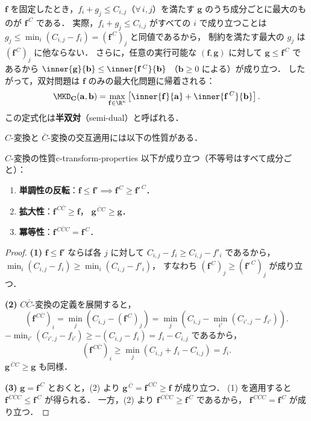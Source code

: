 $\mathbf{f}$ を固定したとき，$f_i + g_j \leq C_{i,j}$（$\forall\, i, j$）を満たす
$\mathbf{g}$ のうち成分ごとに最大のものが $\mathbf{f}^{\,C}$ である．
実際，$f_i + g_j \leq C_{i,j}$ がすべての $i$ で成り立つことは
$g_j \leq \min_i (C_{i,j} - f_i) = (\mathbf{f}^{\,C})_j$ と同値であるから，
制約を満たす最大の $g_j$ は $(\mathbf{f}^{\,C})_j$ に他ならない．
さらに，任意の実行可能な $(\mathbf{f}, \mathbf{g})$ に対して
$\mathbf{g} \leq \mathbf{f}^{\,C}$ であるから
$\inner{\mathbf{g}}{\mathbf{b}} \leq \inner{\mathbf{f}^{\,C}}{\mathbf{b}}$
（$\mathbf{b} \geq 0$ による）が成り立つ．
したがって，双対問題は $\mathbf{f}$ のみの最大化問題に帰着される：
\[
  \MKD_{\mathbf{C}}(\mathbf{a}, \mathbf{b})
  = \max_{\mathbf{f} \in \R^n}
  \left[ \inner{\mathbf{f}}{\mathbf{a}} + \inner{\mathbf{f}^{\,C}}{\mathbf{b}} \right].
\]
この定式化は\textbf{半双対}（semi-dual）と呼ばれる．

$C$-変換と $\bar{C}$-変換の交互適用には以下の性質がある．

\begin{proposition}{$C$-変換の性質}{c-transform-properties}
  以下が成り立つ（不等号はすべて成分ごと）：
  \begin{enumerate}
    \item \textbf{単調性の反転}：$\mathbf{f} \leq \mathbf{f}' \implies \mathbf{f}^{\,C} \geq \mathbf{f}'^{\,C}$．
    \item \textbf{拡大性}：$\mathbf{f}^{\,C\bar{C}} \geq \mathbf{f}$，
      $\mathbf{g}^{\,\bar{C}C} \geq \mathbf{g}$．
    \item \textbf{冪等性}：$\mathbf{f}^{\,C\bar{C}C} = \mathbf{f}^{\,C}$．
  \end{enumerate}
\end{proposition}

\begin{proof}
  \textbf{(1)}
  $\mathbf{f} \leq \mathbf{f}'$ ならば各 $j$ に対して
  $C_{i,j} - f_i \geq C_{i,j} - f'_i$ であるから，
  $\min_i (C_{i,j} - f_i) \geq \min_i (C_{i,j} - f'_i)$，
  すなわち $(\mathbf{f}^{\,C})_j \geq (\mathbf{f}'^{\,C})_j$ が成り立つ．

  \textbf{(2)}
  $C\bar{C}$-変換の定義を展開すると，
  \[
    (\mathbf{f}^{\,C\bar{C}})_i
    = \min_{j} \left( C_{i,j} - (\mathbf{f}^{\,C})_j \right)
    = \min_{j} \left( C_{i,j} - \min_{i'} (C_{i',j} - f_{i'}) \right).
  \]
  $-\min_{i'} (C_{i',j} - f_{i'}) \geq -(C_{i,j} - f_i) = f_i - C_{i,j}$ であるから，
  \[
    (\mathbf{f}^{\,C\bar{C}})_i \geq \min_{j} (C_{i,j} + f_i - C_{i,j}) = f_i.
  \]
  $\mathbf{g}^{\,\bar{C}C} \geq \mathbf{g}$ も同様．

  \textbf{(3)}
  $\mathbf{g} = \mathbf{f}^{\,C}$ とおくと，(2) より
  $\mathbf{g}^{\,\bar{C}} = \mathbf{f}^{\,C\bar{C}} \geq \mathbf{f}$ が成り立つ．
  (1) を適用すると $\mathbf{f}^{\,C\bar{C}C} \leq \mathbf{f}^{\,C}$ が得られる．
  一方，(2) より $\mathbf{f}^{\,C\bar{C}C} \geq \mathbf{f}^{\,C}$ であるから，
  $\mathbf{f}^{\,C\bar{C}C} = \mathbf{f}^{\,C}$ が成り立つ．
\end{proof}

